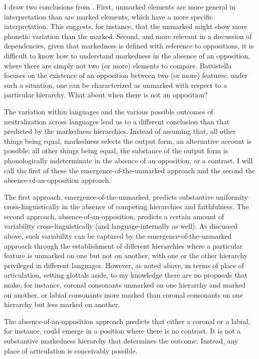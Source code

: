\documentclass[output=paper]{langsci/langscibook}
\begin{document}
 I draw two conclusions from \citet{Battistella1990}. First, unmarked elements are more general in interpretation than are marked elements, which have a more specific interpretation. This suggests, for instance, that the unmarked might show more phonetic variation than the marked. Second, and more relevant in a discussion of dependencies, given that markedness is defined with reference to oppositions, it is difficult to know how to understand markedness in the absence of an opposition, where there are simply not two (or more) elements to compare. Battistella focuses on the existence of an opposition between two (or more) features; under such a situation, one can be characterized as unmarked with respect to a particular hierarchy. What about when there is not an opposition? 

The variation within languages and the various possible outcomes of neutralization across languages lead us to a different conclusion than that predicted by the markedness hierarchies. Instead of assuming that, all other things being equal, markedness selects the output form, an alternative account is possible: all other things being equal, the substance of the output form is phonologically indeterminate in the absence of an opposition, or a contrast. I will call the first of these the emergence-of-the-unmarked approach and the second the absence-of-an-opposition approach.

  The first approach, emergence-of-the-unmarked, predicts substantive uniformity cross-linguistically in the absence of competing hierarchies and faithfulness. The second approach, absence-of-an-opposition, predicts a certain amount of variability cross-linguistically (and language-internally as well). As discussed above, such variability can be captured by the emergence-of-the-unmarked approach through the establishment of different hierarchies where a particular feature is unmarked on one but not on another, with one or the other hierarchy privileged in different languages. However, as noted above, in terms of place of articulation, setting glottals aside, to my knowledge there are no proposals that make, for instance, coronal consonants unmarked on one hierarchy and marked on another, or labial consonants more marked than coronal consonants on one hierarchy but less marked on another. 

The absence-of-an-opposition approach predicts that either a coronal or a labial, for instance, could emerge in a position where there is no contrast. It is not a substantive markedness hierarchy that determines the outcome. Instead, any place of articulation is conceivably possible.
\end{document}
